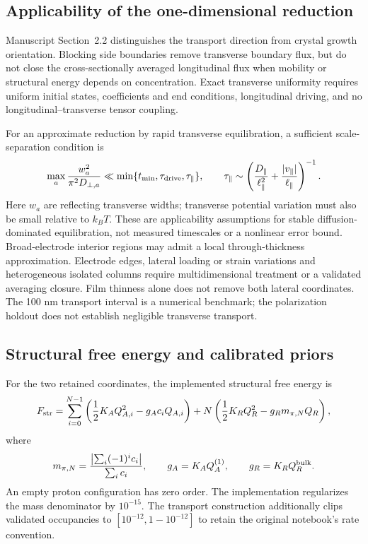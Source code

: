 \documentclass[11pt,a4paper]{article}
\begin{document}
\subsection{Applicability of the one-dimensional reduction}
Manuscript Section~2.2 distinguishes the transport direction from crystal growth orientation. Blocking side boundaries remove transverse boundary flux, but do not close the cross-sectionally averaged longitudinal flux when mobility or structural energy depends on concentration. Exact transverse uniformity requires uniform initial states, coefficients and end conditions, longitudinal driving, and no longitudinal--transverse tensor coupling.

For an approximate reduction by rapid transverse equilibration, a sufficient scale-separation condition is
\begin{equation}
\max_a\frac{w_a^2}{\pi^2D_{\perp,a}}\ll\min\{t_{\min},\tau_{\rm drive},\tau_\parallel\},\qquad
\tau_\parallel\sim\left(\frac{D_\parallel}{\ell_\parallel^2}+\frac{|v_\parallel|}{\ell_\parallel}\right)^{-1}.
\end{equation}
Here $w_a$ are reflecting transverse widths; transverse potential variation must also be small relative to $k_BT$. These are applicability assumptions for stable diffusion-dominated equilibration, not measured timescales or a nonlinear error bound. Broad-electrode interior regions may admit a local through-thickness approximation. Electrode edges, lateral loading or strain variations and heterogeneous isolated columns require multidimensional treatment or a validated averaging closure. Film thinness alone does not remove both lateral coordinates. The 100 nm transport interval is a numerical benchmark; the polarization holdout does not establish negligible transverse transport.

\subsection{Structural free energy and calibrated priors}

For the two retained coordinates, the implemented structural free energy is
\begin{equation}
 F_{\rm str}=\sum_{i=0}^{N-1}\left(\frac12K_A Q_{A,i}^2-g_A c_iQ_{A,i}\right)
 +N\left(\frac12K_RQ_R^2-g_Rm_{\pi,N}Q_R\right),
 \label{eq:energy}
\end{equation}
where
\begin{equation}
 m_{\pi,N}=\frac{\left|\sum_i(-1)^ic_i\right|}{\sum_i c_i},\qquad
 g_A=K_AQ_A^{(1)},\qquad g_R=K_RQ_R^{\rm bulk}.
\end{equation}
An empty proton configuration has zero order. The implementation regularizes the mass denominator by $10^{-15}$. The transport construction additionally clips validated occupancies to $[10^{-12},1-10^{-12}]$ to retain the original notebook's rate convention.
\end{document}
